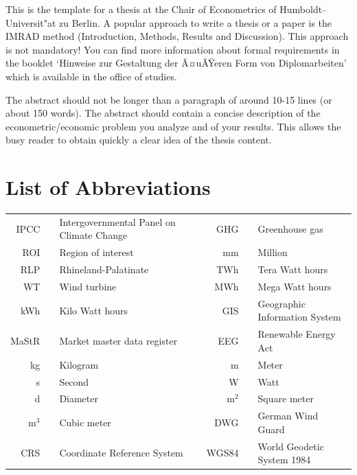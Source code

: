 \documentclass[a4paper,11pt]{article}
\begin{document}
This is the template for a thesis at the Chair of Econometrics of
Humboldt--Universit"at zu Berlin. A popular approach to write a thesis or a
paper is the IMRAD method (Introduction, Methods, Results and Discussion). This
approach is not mandatory! You can find more information about formal
requirements in the booklet `Hinweise zur Gestaltung der Ã¤uÃŸeren Form von
Diplomarbeiten' which is available in the office of studies.

The abstract should not be longer than a paragraph of around 10-15 lines (or
about 150 words). The abstract should contain a concise description of the
econometric/economic problem you analyze and of your results. This allows the
busy reader to obtain quickly a clear idea of the thesis content.

\newpage
\hypertarget{list-of-abbreviations}{%
\section*{List of Abbreviations}\label{list-of-abbreviations}}
\begin{tabular}{rp{0.2cm}lp{1cm}rp{0.2cm}l}
    IPCC    & &  Intergovernmental Panel on Climate Change & & GHG & & Greenhouse gas \\
    ROI     & &  Region of interest           & & mm      & &  Million \\   
    RLP     & &  Rhineland-Palatinate         & & TWh     & &  Tera Watt hours  \\
    WT      & &  Wind turbine                 & & MWh     & &  Mega Watt hours \\
    kWh     & &  Kilo Watt hours              & & GIS     & &  Geographic Information System \\
    MaStR   & &  Market master data register  & & EEG     & &  Renewable Energy Act \\
    kg      & &  Kilogram                     & & m       & &  Meter \\
    s       & &  Second                       & & W       & &  Watt \\
    d       & &  Diameter                     & & m$^2$   & &  Square meter \\
    m$^3$   & &  Cubic meter                  & & DWG     & &  German Wind Guard \\
    CRS     & &  Coordinate Reference System  & & WGS84   & &  World Geodetic System 1984 \\ 
    
\end{tabular}
\newpage
\listoffigures
{}
\end{document}
